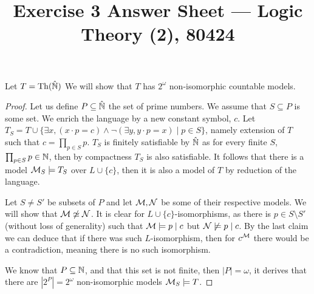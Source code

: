 
\title{Exercise 3 Answer Sheet --- Logic Theory (2), 80424}


\maketitle
\maketitleprint{}

\question{}
Let $T = \operatorname{Th}(\hat{\mathbb{N}})$
We will show that $T$ has $2^\omega$ non-isomorphic countable models.
\begin{proof}
	Let us define $P \subseteq \hat{\mathbb{N}}$ the set of prime numbers.
	We assume that $S \subseteq P$ is some set.
	We enrich the language by a new constant symbol, $c$.
	Let $T_S = T \cup \{ \exists x, (x \cdot p = c) \land \lnot (\exists y, y \cdot p = x) \mid p \in S \}$, namely extension of $T$ such that $c = \prod_{p \in S} p$.
	$T_S$ is finitely satisfiable by $\hat{\mathbb{N}}$ as for every finite $S$, $\prod_{p \in S} p \in \mathbb{N}$, then by compactness $T_S$ is also satisfiable.
	It follows that there is a model $\mathcal{M}_S \models T_S$ over $L \cup \{ c \}$, then it is also a model of $T$ by reduction of the language.
	
	Let $S \ne S'$ be subsets of $P$ and let $\mathcal{M}, \mathcal{N}$ be some of their respective models.
	We will show that $\mathcal{M} \not\simeq \mathcal{N}$.
	It is clear for $L \cup \{ c \}$-isomorphisms, as there is $p \in S \setminus S'$ (without loss of generality) such that $\mathcal{M} \models p \mid c$ but $\mathcal{N} \not\models p \mid c$.
	By the last claim we can deduce that if there was such $L$-isomorphism, then for $c^{\mathcal{M}}$ there would be a contradiction, meaning there is no such isomorphism.

	We know that $P \subseteq \mathbb{N}$, and that this set is not finite, then $|P| = \omega$, it derives that there are $|2^P| = 2^\omega$ non-isomorphic models $\mathcal{M}_S \models T$.
\end{proof}

